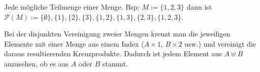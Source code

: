 \vspace{-.6cm}

\begin{framed} [Potenzmenge:] 
  Jede mögliche Teilmenge einer Menge. Bsp: $M := \{1,2,3\}$ dann ist
  $\mathcal{P}(M) := \{\emptyset\},\{1\},\{2\},\{3\},\{1,2\},\{1,3\},\{2,3\},\{1,2,3\}$.
\end{framed}

\vspace{-.6cm}

\begin{framed}  
    Bei der disjunkten Vereinigung zweier Mengen kreuzt man die jeweiligen 
    Elemente mit einer Menge aus einem Index ($A \times {1}$, $B \times {2}$ usw.) 
    und vereinigt die daraus resultierenden Kreuzprodukte. 
    Dadurch ist jedem Element aus $A \uplus B$ anzusehen, ob es aus $A$ oder $B$ 
    stammt.
\end{framed}
